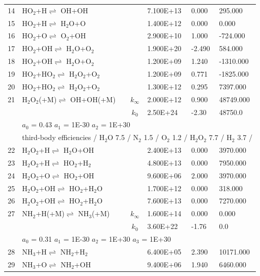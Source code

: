 \documentclass[11pt]{article}
\begin{document}
\begin{table}[hbt]
\begin{tabular}{|r l c l l l|}
14 &	HO$_{2}$+H$\rightleftharpoons$ OH+OH&	&	7.100E+13&	0.000&	295.000\\ 
15 &	HO$_{2}$+H$\rightleftharpoons$ H$_{2}$O+O&	&	1.400E+12&	0.000&	0.000\\ 
16 &	HO$_{2}$+O$\rightleftharpoons$ O$_{2}$+OH&	&	2.900E+10&	1.000&	-724.000\\ 
17 &	HO$_{2}$+OH$\rightleftharpoons$ H$_{2}$O+O$_{2}$&	&	1.900E+20&	-2.490&	584.000\\ 
18 &	HO$_{2}$+OH$\rightleftharpoons$ H$_{2}$O+O$_{2}$&	&	1.200E+09&	1.240&	-1310.000\\ 
19 &	HO$_{2}$+HO$_{2}$$\rightleftharpoons$ H$_{2}$O$_{2}$+O$_{2}$&	&	1.200E+09&	0.771&	-1825.000\\ 
20 &	HO$_{2}$+HO$_{2}$$\rightleftharpoons$ H$_{2}$O$_{2}$+O$_{2}$&	&	1.300E+12&	0.295&	7397.000\\ 
21 &	H$_{2}$O$_{2}$(+M)$\rightleftharpoons$ OH+OH(+M)&	$k_{\infty}$&	2.000E+12&	0.900&	48749.000\\ 
	&	&	$k_0$&	2.50E+24&-2.30&	48750.0\\ 
	&\multicolumn{5}{l|}{	$a_0$ = 0.43	$a_1$ = 1E-30	$a_2$ = 1E+30}\\ 
	&\multicolumn{5}{l|}{third-body efficiencies  / H$_{2}$O 7.5 / N$_{2}$ 1.5 / O$_{2}$ 1.2 / H$_{2}$O$_{2}$ 7.7 / H$_{2}$ 3.7 /}\\ 
22 &	H$_{2}$O$_{2}$+H$\rightleftharpoons$ H$_{2}$O+OH&	&	2.400E+13&	0.000&	3970.000\\ 
23 &	H$_{2}$O$_{2}$+H$\rightleftharpoons$ HO$_{2}$+H$_{2}$&	&	4.800E+13&	0.000&	7950.000\\ 
24 &	H$_{2}$O$_{2}$+O$\rightleftharpoons$ HO$_{2}$+OH&	&	9.600E+06&	2.000&	3970.000\\ 
25 &	H$_{2}$O$_{2}$+OH$\rightleftharpoons$ HO$_{2}$+H$_{2}$O&	&	1.700E+12&	0.000&	318.000\\ 
26 &	H$_{2}$O$_{2}$+OH$\rightleftharpoons$ HO$_{2}$+H$_{2}$O&	&	7.600E+13&	0.000&	7270.000\\ 
27 &	NH$_{2}$+H(+M)$\rightleftharpoons$ NH$_{3}$(+M)&	$k_{\infty}$&	1.600E+14&	0.000&	0.000\\ 
	&	&	$k_0$&	3.60E+22&-1.76&	    0.0\\ 
	&\multicolumn{5}{l|}{	$a_0$ = 0.31	$a_1$ = 1E-30	$a_2$ = 1E+30	$a_3$ = 1E+30}\\ 
28 &	NH$_{3}$+H$\rightleftharpoons$ NH$_{2}$+H$_{2}$&	&	6.400E+05&	2.390&	10171.000\\ 
29 &	NH$_{3}$+O$\rightleftharpoons$ NH$_{2}$+OH&	&	9.400E+06&	1.940&	6460.000\\ 

\end{tabular}
\end{table}
\end{document}
